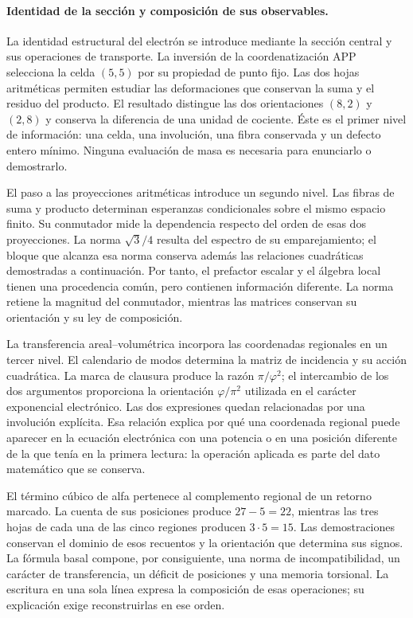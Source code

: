 \paragraph{Identidad de la sección y composición de sus observables.}
\label{el-ampl-articulacion}
La identidad estructural del electrón se introduce mediante la sección
central y sus operaciones de transporte. La inversión de la coordenatización APP
selecciona la celda $(5,5)$ por su propiedad de punto fijo. Las dos hojas
aritméticas permiten estudiar las deformaciones que conservan la suma y
el residuo del producto. El resultado distingue las dos orientaciones
$(8,2)$ y $(2,8)$ y conserva la diferencia de una unidad de cociente.
Éste es el primer nivel de información: una celda, una involución, una
fibra conservada y un defecto entero mínimo. Ninguna evaluación de masa
es necesaria para enunciarlo o demostrarlo.

El paso a las proyecciones aritméticas introduce un segundo nivel. Las
fibras de suma y producto determinan esperanzas condicionales sobre el
mismo espacio finito. Su conmutador mide la dependencia respecto del
orden de esas dos proyecciones. La norma $\sqrt3/4$ resulta del espectro
de su emparejamiento; el bloque que alcanza esa norma conserva además
las relaciones cuadráticas demostradas a continuación. Por tanto, el
prefactor escalar y el álgebra local tienen una procedencia común, pero
contienen información diferente. La norma retiene la magnitud del
conmutador, mientras las matrices conservan su orientación y su ley de
composición.

La transferencia areal--volumétrica incorpora las coordenadas regionales
en un tercer nivel. El calendario de modos determina la matriz de
incidencia y su acción cuadrática. La marca de clausura produce la razón
$\pi/\varphi^2$; el intercambio de los dos argumentos proporciona la
orientación $\varphi/\pi^2$ utilizada en el carácter exponencial
electrónico. Las dos expresiones quedan relacionadas por una involución
explícita. Esa relación explica por qué una coordenada regional puede
aparecer en la ecuación electrónica con una potencia o en una posición
diferente de la que tenía en la primera lectura: la operación aplicada
es parte del dato matemático que se conserva.

El término cúbico de alfa pertenece al complemento regional de un retorno
marcado. La cuenta de sus posiciones produce $27-5=22$, mientras las
tres hojas de cada una de las cinco regiones producen $3\cdot5=15$.
Las demostraciones conservan el dominio de esos recuentos y la
orientación que determina sus signos. La fórmula basal compone,
por consiguiente, una norma de incompatibilidad, un carácter de
transferencia, un déficit de posiciones y una memoria torsional.
La escritura en una sola línea expresa la composición de esas
operaciones; su explicación exige reconstruirlas en ese orden.

